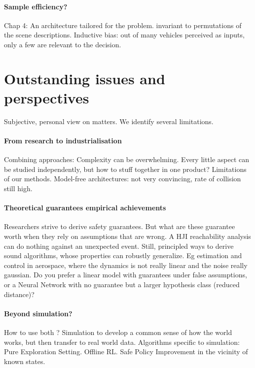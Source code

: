 \paragraph{Sample efficiency?}
Chap 4: An architecture tailored for the problem. invariant to permutations of the scene descriptions. Inductive bias: out of many vehicles perceived as inputs, only a few are relevant to the decision.

\section{Outstanding issues and perspectives}
Subjective, personal view on matters.
We identify several limitations.

\paragraph{From research to industrialisation}
Combining approaches: Complexity can be overwhelming. Every little aspect can be studied independently, but how to stuff together in one product?
Limitations of our methods. Model-free architectures: not very convincing, rate of collision still high.

\paragraph{Theoretical guarantees \vs empirical achievements}
Researchers strive to derive safety guarantees. 
But what are these guarantee worth when they rely on assumptions that are wrong. 
A HJI reachability analysis can do nothing against an unexpected event.
Still, principled ways to derive sound algorithms, whose properties can robustly generalize. Eg estimation and control in aerospace, where the dynamics is not really linear and the noise really gaussian.
Do you prefer a linear model with guarantees under false assumptions, or a Neural Network with no guarantee but a larger hypothesis class (reduced distance)?

\paragraph{Beyond simulation?}
How to use both ?
Simulation to develop a common sense of how the world works, but then transfer to real world data.
Algorithms specific to simulation: Pure Exploration Setting.
Offline RL. Safe Policy Improvement in the vicinity of known states.





